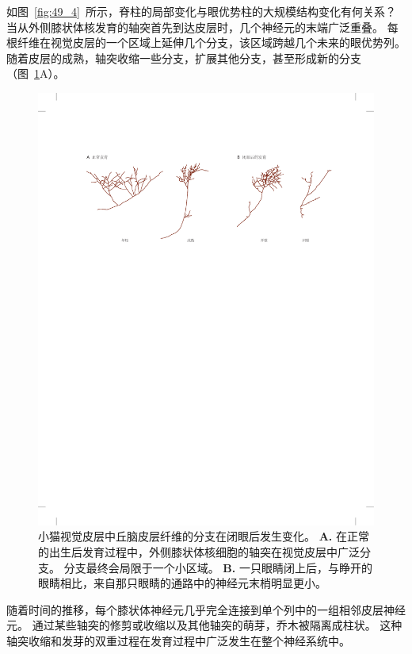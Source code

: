 如图~\ref{fig:49_4}~所示，脊柱的局部变化与眼优势柱的大规模结构变化有何关系？
当从外侧膝状体核发育的轴突首先到达皮层时，几个神经元的末端广泛重叠。
每根纤维在视觉皮层的一个区域上延伸几个分支，该区域跨越几个未来的眼优势列。
随着皮层的成熟，轴突收缩一些分支，扩展其他分支，甚至形成新的分支（图~\ref{fig:49_11}A）。


\begin{figure}[htbp]
	\centering
	\includegraphics[width=0.95\linewidth]{chap49/fig_49_11}
	\caption{小猫视觉皮层中丘脑皮层纤维的分支在闭眼后发生变化\cite{antonini1993rapid}。
		\textbf{A.} 在正常的出生后发育过程中，外侧膝状体核细胞的轴突在视觉皮层中广泛分支。
		分支最终会局限于一个小区域。
		\textbf{B.} 一只眼睛闭上后，与睁开的眼睛相比，来自那只眼睛的通路中的神经元末梢明显更小。}
	\label{fig:49_11}
\end{figure}


随着时间的推移，每个膝状体神经元几乎完全连接到单个列中的一组相邻皮层神经元。
通过某些轴突的修剪或收缩以及其他轴突的萌芽，乔木被隔离成柱状。
这种轴突收缩和发芽的双重过程在发育过程中广泛发生在整个神经系统中。


